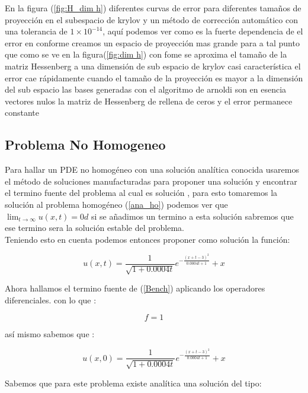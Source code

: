 \documentclass[11pt, spanish]{article}
\begin{document}
En la figura (\ref{fig:H_dim h}) diferentes curvas de error para diferentes tamaños de proyecci\'on en el subespacio de krylov  y un m\'etodo de correcci\'on autom\'atico con una tolerancia de $1\times 10^{-14}$, aqu\'i podemos ver como es la fuerte dependencia de el error en conforme creamos un espacio de proyecci\'on mas grande para  a tal punto que como se ve en la figura(\ref{fig:dim h})  con fome se aproxima  el tamaño de la matriz 
Hessenberg a una dimensi\'on de sub espacio de krylov casi caracter\'istica el error cae r\'apidamente  cuando el tamaño de la proyecci\'on es mayor a  la dimensi\'on del sub espacio  las bases generadas con el algoritmo de arnoldi son en esencia vectores nulos la matriz de Hessenberg de rellena de ceros  y el error permanece constante    

\subsection{Problema No Homogeneo}

Para hallar un PDE no homog\'eneo con una soluci\'on anal\'itica conocida usaremos el m\'etodo de soluciones manufacturadas para proponer una soluci\'on y encontrar el termino fuente del problema al cual es soluci\'on \cite{Roache2019}, para esto tomaremos la soluci\'on al problema homog\'eneo (\ref{ana_ho}) podemos ver que $\lim_{t\to\infty} u(x,t)  = 0d$ si se añadimos un termino a esta soluci\'on sabremos que ese termino sera la soluci\'on estable del problema. \\

Teniendo esto en cuenta  podemos entonces proponer como soluci\'on la  funci\'on: 

\begin{equation}
    u(x,t) =\frac{1}{\sqrt{1+0.0004 t}}e^{- \frac{(x+t-3)^2}{0.0004t+1}} +x
    \label{ana_no_ho}
\end{equation}

Ahora hallamos el termino fuente de (\ref{Bench}) aplicando los operadores diferenciales. con lo que : 

\begin{equation}
    f = 1
\end{equation}

as\'i mismo sabemos que : 

\begin{equation}
    u(x,0) = \frac{1}{\sqrt{1+0.0004 t}}e^{- \frac{(x+t-3)^2}{0.0004t+1}} +x
\end{equation}


Sabemos que para este problema existe anal\'itica una soluci\'on del tipo:
\end{document}
